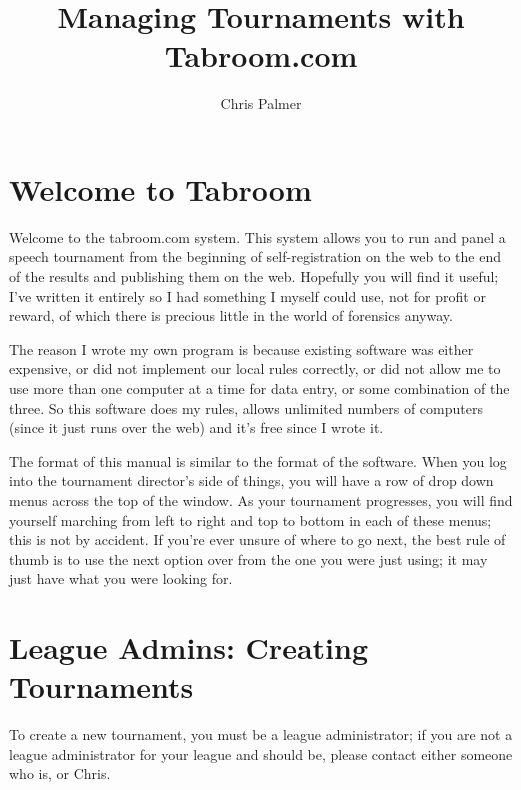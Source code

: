 \documentclass[12pt]{report} \usepackage {fullpage} \usepackage{times}
\author{Chris Palmer}
\begin{document}
 \normalsize

\title{Managing Tournaments with Tabroom.com} \maketitle

\date

\tableofcontents

\newpage

\chapter{Welcome to Tabroom}

Welcome to the tabroom.com system.  This system allows you to run and panel
a speech tournament from the beginning of self-registration on the web to
the end of the results and publishing them on the web.   Hopefully you will
find it useful; I've written it entirely so I had something I myself could
use, not for profit or reward, of which there is precious little in the
world of forensics anyway.

\medskip

The reason I wrote my own program is because existing software was either
expensive, or did not implement our local rules correctly, or did not allow
me to use more than one computer at a time for data entry, or some
combination of the three.   So this software does my rules, allows
unlimited numbers of computers (since it just runs over the web) and it's
free since I wrote it. 

\medskip

The format of this manual is similar to the format of the software.  When
you log into the tournament director's side of things, you will have a row
of drop down menus across the top of the window.    As your tournament
progresses, you will find yourself marching from left to right and top to
bottom in each of these menus; this is not by accident.   If you're ever
unsure of where to go next, the best rule of thumb is to use the next
option over from the one you were just using; it may just have what you
were looking for.


\chapter{League Admins: Creating Tournaments}

To create a new tournament, you must be a league administrator; if you are
not a league administrator for your league and should be, please contact
either someone who is, or Chris.
\end{document}
